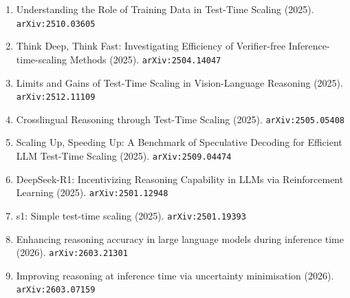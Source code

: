 \documentclass[11pt]{article}
\begin{document}
\begin{enumerate}
  \item Understanding the Role of Training Data in Test-Time Scaling (2025). \texttt{arXiv:2510.03605}
  \item Think Deep, Think Fast: Investigating Efficiency of Verifier-free
  Inference-time-scaling Methods (2025). \texttt{arXiv:2504.14047}
  \item Limits and Gains of Test-Time Scaling in Vision-Language Reasoning (2025). \texttt{arXiv:2512.11109}
  \item Crosslingual Reasoning through Test-Time Scaling (2025). \texttt{arXiv:2505.05408}
  \item Scaling Up, Speeding Up: A Benchmark of Speculative Decoding for Efficient LLM Test-Time Scaling (2025). \texttt{arXiv:2509.04474}
  \item DeepSeek-R1: Incentivizing Reasoning Capability in LLMs via Reinforcement Learning (2025). \texttt{arXiv:2501.12948}
  \item s1: Simple test-time scaling (2025). \texttt{arXiv:2501.19393}
  \item Enhancing reasoning accuracy in large language models during inference time (2026). \texttt{arXiv:2603.21301}
  \item Improving reasoning at inference time via uncertainty minimisation (2026). \texttt{arXiv:2603.07159}
\end{enumerate}
\end{document}
